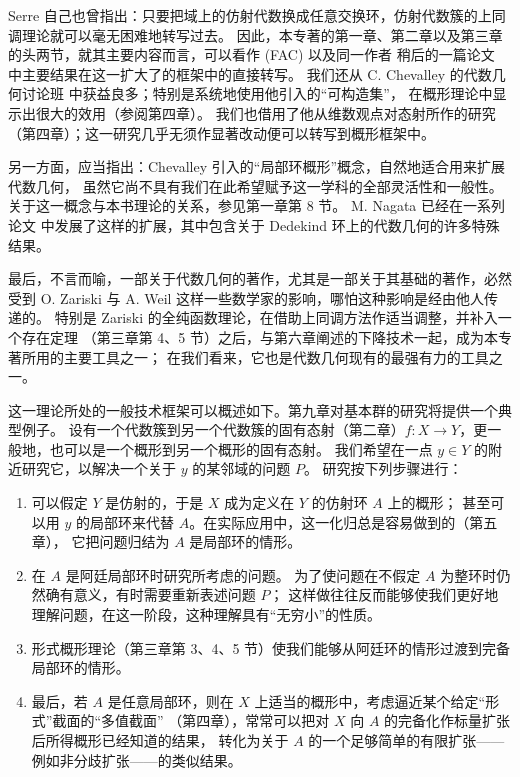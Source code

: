 Serre 自己也曾指出：只要把域上的仿射代数换成任意交换环，仿射代数簇的上同调理论就可以毫无困难地转写过去。
因此，本专著的第一章、第二章以及第三章的头两节，就其主要内容而言，可以看作 (FAC) 以及同一作者
稍后的一篇论文\cite{b15} 中主要结果在这一扩大了的框架中的直接转写。
我们还从 C. Chevalley 的代数几何讨论班\cite{b1} 中获益良多；特别是系统地使用他引入的“可构造集”，
在概形理论中显示出很大的效用（参阅第四章）。
我们也借用了他从维数观点对态射所作的研究（第四章）；这一研究几乎无须作显著改动便可以转写到概形框架中。

另一方面，应当指出：Chevalley 引入的“局部环概形”概念，自然地适合用来扩展代数几何，
虽然它尚不具有我们在此希望赋予这一学科的全部灵活性和一般性。
关于这一概念与本书理论的关系，参见第一章第 8 节。
M. Nagata 已经在一系列论文\cite{b9} 中发展了这样的扩展，其中包含关于 Dedekind 环上的代数几何的许多特殊结果。

\separation

最后，不言而喻，一部关于代数几何的著作，尤其是一部关于其基础的著作，必然受到 O. Zariski 与 A. Weil
这样一些数学家的影响，哪怕这种影响是经由他人传递的。
特别是 Zariski 的全纯函数理论\cite{b20}，在借助上同调方法作适当调整，并补入一个存在定理
（第三章第 4、5 节）之后，与第六章阐述的下降技术一起，成为本专著所用的主要工具之一；
在我们看来，它也是代数几何现有的最强有力的工具之一。

这一理论所处的一般技术框架可以概述如下。第九章对基本群的研究将提供一个典型例子。
设有一个代数簇到另一个代数簇的固有态射（第二章）$f\colon X\to Y$，更一般地，也可以是一个概形到另一个概形的固有态射。
我们希望在一点 $y\in Y$ 的附近研究它，以解决一个关于 $y$ 的某邻域的问题 $P$。
研究按下列步骤进行：
\begin{enumerate}[label=\arabic*$^\circ$]
\item 可以假定 $Y$ 是仿射的，于是 $X$ 成为定义在 $Y$ 的仿射环 $A$ 上的概形；
甚至可以用 $y$ 的局部环来代替 $A$。在实际应用中，这一化归总是容易做到的（第五章），
它把问题归结为 $A$ 是局部环的情形。
\item 在 $A$ 是阿廷局部环时研究所考虑的问题。
为了使问题在不假定 $A$ 为整环时仍然确有意义，有时需要重新表述问题 $P$；
这样做往往反而能够使我们更好地理解问题，在这一阶段，这种理解具有“无穷小”的性质。
\item 形式概形理论（第三章第 3、4、5 节）使我们能够从阿廷环的情形过渡到完备局部环的情形。
\item 最后，若 $A$ 是任意局部环，则在 $X$ 上适当的概形中，考虑逼近某个给定“形式”截面的“多值截面”
（第四章），常常可以把对 $X$ 向 $A$ 的完备化作标量扩张后所得概形已经知道的结果，
转化为关于 $A$ 的一个足够简单的有限扩张——例如非分歧扩张——的类似结果。
\end{enumerate}

